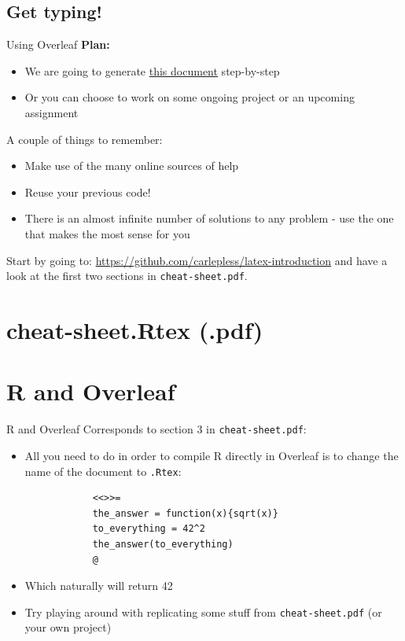 \documentclass[10pt]{beamer}
\begin{document}
\subsection{Get typing!}
\begin{frame}{Using Overleaf}
\textbf{Plan:}
\begin{itemize}
    \item We are going to generate \href{https://github.com/carlepless/latex-introduction/blob/main/cheat-sheet/cheat-sheet.pdf}{\color{blue}this document} step-by-step
    \item Or you can choose to work on some ongoing project or an upcoming assignment
\end{itemize}
A couple of things to \alert{remember}:
\begin{itemize}
    \item Make use of the many online sources of help
    \item Reuse your previous \alert{code}!
    \item There is an \alert{almost infinite} number of solutions to any problem - use the one that makes the most sense for you
\end{itemize}
 \alert{Start by going to:} \href{https://github.com/carlepless/latex-introduction}{\color{blue}https://github.com/carlepless/latex-introduction} and have a look at the first two sections in \texttt{cheat-sheet.pdf}.
\end{frame}

\section{cheat-sheet.Rtex (.pdf)}
\section*{R and Overleaf}
\begin{frame}[fragile]{R and Overleaf}
    Corresponds to \alert{section 3} in \texttt{cheat-sheet.pdf}:
    \begin{itemize}
        \item All you need to do in order to \alert{compile R directly} in Overleaf is to change the name of the document to \texttt{.Rtex}:
        \begin{lstlisting}
            <<>>=
            the_answer = function(x){sqrt(x)}
            to_everything = 42^2
            the_answer(to_everything)
            @
        \end{lstlisting}
        \item<3-> Which naturally will return \alert{42}
        \item<4-> Try playing around with replicating some stuff from \texttt{cheat-sheet.pdf} (or your own project)
    \end{itemize}
\end{frame}
\end{document}

